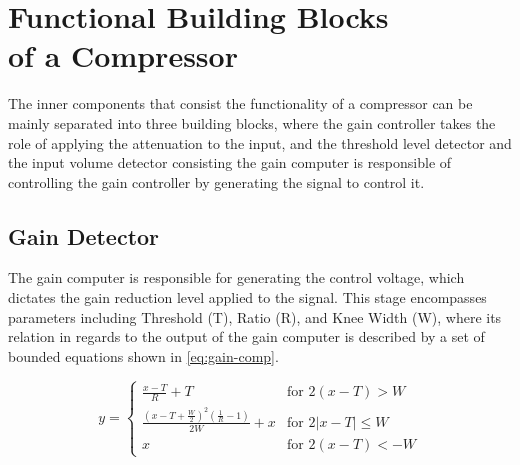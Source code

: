 \documentclass[10pt]{article}
\begin{document}
\begin{multicols*}{2}
\begin{minipage}{\linewidth}
                        
                        \label{fig:feedforward}
                    
                    \end{minipage}

        \section[Functional Building Blocks of a Compressor]{Functional Building Blocks\\of a Compressor}
            The inner components that consist the functionality of a compressor can be mainly separated into three building blocks, where the gain controller takes the role of applying the attenuation to the input, and the threshold level detector and the input volume detector consisting the gain computer is responsible of controlling the gain controller by generating the signal to control it.

            \subsection{Gain Detector}
                The gain computer is responsible for generating the control voltage, which dictates the gain reduction level applied to the signal. This stage encompasses parameters including Threshold (T), Ratio (R), and Knee Width (W), where its relation in regards to the output of the gain computer is described by a set of bounded equations shown in \ref{eq:gain-comp}.

                    \begin{equation}
                        y=
                        \begin{cases}
                            \frac{x-T}{R}+T & \text{for $2(x-T)>W$}\\[5pt]
                            \frac{(x-T+\frac{W}{2})^2(\frac{1}{R}-1)}{2W}+x & \text{for $2\left\lvert x-T\right\rvert\leq W$}\\[5pt]
                            x & \text{for $2(x-T)<-W$}
                        \end{cases}
                        \label{eq:gain-comp}
                    \end{equation}


\end{multicols*}
\end{document}
